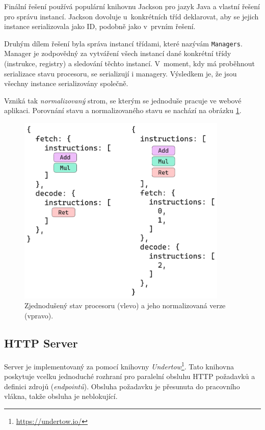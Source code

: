 Finální řešení používá populární knihovnu Jackson pro jazyk Java a vlastní řešení pro správu instancí.
Jackson dovoluje u~konkrétních tříd deklarovat, aby se jejich instance serializovala jako ID, podobně jako v~prvním řešení.

Druhým dílem řešení byla správa instancí třídami, které nazývám \texttt{Managers}.
Manager je zodpovědný za vytváření všech instancí dané konkrétní třídy (instrukce, registry) a sledování těchto instancí.
V~moment, kdy má proběhnout serializace stavu procesoru, se serializují i managery.
Výsledkem je, že jsou všechny instance serializovány společně.

Vzniká tak \emph{normalizovaný} strom, se kterým se jednoduše pracuje ve webové aplikaci.
Porovnání stavu a normalizovaného stavu se nachází na obrázku \ref{json_norm}.

\begin{figure}[hbtp]
\centering
    \includegraphics[width=10cm]{obrazky-figures/impl/json_normalization.png}
    \caption{Zjednodušený stav procesoru (vlevo) a jeho normalizovaná verze (vpravo).} 
    \label{json_norm}
\end{figure}

\subsection{HTTP Server}

Server je implementovaný za pomocí knihovny \emph{Undertow}\footnote{\url{https://undertow.io/}}.
Tato knihovna poskytuje vcelku jednoduché rozhraní pro paralelní obsluhu HTTP požadavků a definici zdrojů (\emph{endpointů}).
Obsluha požadavku je přesunuta do pracovního vlákna, takže obsluha je neblokující.

